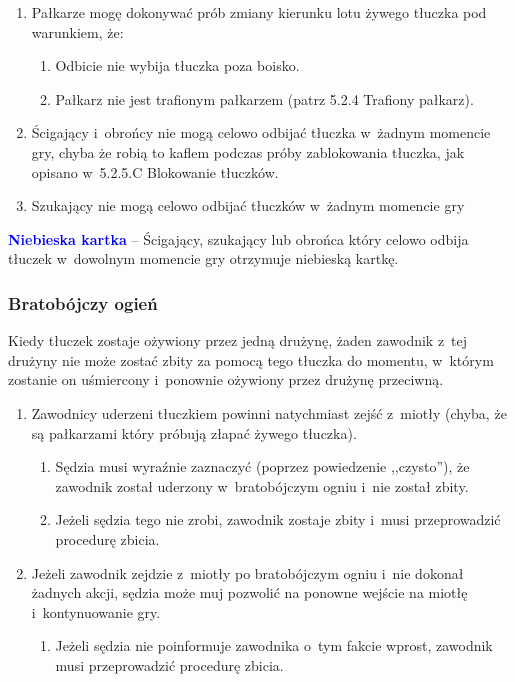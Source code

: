 \documentclass[12pt,a4paper]{article}
\newcommand\bluecard[1]{\bgroup\textcolor{blue}{\textbf{#1}}}
\begin{document}
\begin{enumerate}
	\item
	      Pałkarze mogę dokonywać prób zmiany kierunku lotu żywego tłuczka pod
	      warunkiem, że:

	      \begin{enumerate}
		      \item
		            Odbicie nie wybija tłuczka poza boisko.
		      \item
		            Pałkarz nie jest trafionym pałkarzem (patrz 5.2.4 Trafiony pałkarz).
	      \end{enumerate}
	\item
	      Ścigający i~obrońcy nie mogą celowo odbijać tłuczka w~żadnym momencie
	      gry, chyba że robią to kaflem podczas próby zablokowania tłuczka, jak
	      opisano w~5.2.5.C Blokowanie tłuczków.
	\item
	      Szukający nie mogą celowo odbijać tłuczków w~żadnym momencie gry
\end{enumerate}

\bluecard{Niebieska kartka} -- Ścigający, szukający lub obrońca który celowo
odbija tłuczek w~dowolnym momencie gry otrzymuje niebieską kartkę.

\subsubsection{Bratobójczy ogień}

Kiedy tłuczek zostaje ożywiony przez jedną drużynę, żaden zawodnik z~tej
drużyny nie może zostać zbity za pomocą tego tłuczka do momentu, w~którym zostanie on uśmiercony i~ponownie ożywiony przez drużynę
przeciwną.

\begin{enumerate}
	\item
	      Zawodnicy uderzeni tłuczkiem powinni natychmiast zejść z~miotły
	      (chyba, że są pałkarzami który próbują złapać żywego tłuczka).

	      \begin{enumerate}
		      \item
		            Sędzia musi wyraźnie zaznaczyć (poprzez powiedzenie ,,czysto''), że
		            zawodnik został uderzony w~bratobójczym ogniu i~nie został zbity.
		      \item
		            Jeżeli sędzia tego nie zrobi, zawodnik zostaje zbity i~musi
		            przeprowadzić procedurę zbicia.
	      \end{enumerate}
	\item
	      Jeżeli zawodnik zejdzie z~miotły po bratobójczym ogniu i~nie dokonał
	      żadnych akcji, sędzia może muj pozwolić na ponowne wejście na miotłę i~kontynuowanie gry.

	      \begin{enumerate}
		      \item
		            Jeżeli sędzia nie poinformuje zawodnika o~tym fakcie wprost,
		            zawodnik musi przeprowadzić procedurę zbicia.
	      \end{enumerate}
\end{enumerate}
\end{document}

